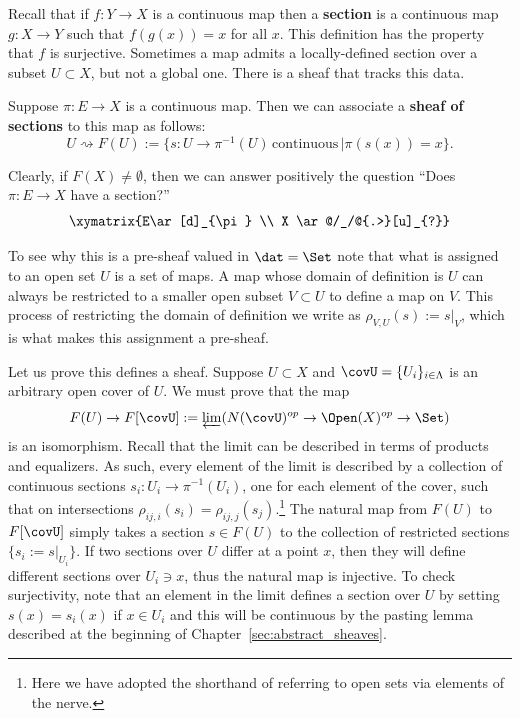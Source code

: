 Recall that if $f:Y\to X$ is a continuous map then a \textbf{section} is a continuous map $g:X\to Y$ such that $f(g(x))=x$ for all $x$. This definition has the property that $f$ is surjective. Sometimes a map admits a locally-defined section over a subset $U\subset X$, but not a global one. There is a sheaf that tracks this data.

\begin{defn}
	Suppose $\pi:E\to X$ is a continuous map. Then we can associate a \textbf{sheaf of sections} to this map as follows:
	\[
	U\rightsquigarrow F(U):=\{s:U\to \pi^{-1}(U)\,\mathrm{continuous}\, | \pi(s(x))=x \}.
	\]
\end{defn}

Clearly, if $F(X)\neq \emptyset$, then we can answer positively the question ``Does $\pi:E\to X$ have a section?''
\[
\xymatrix{E\ar[d]_{\pi} \\ X \ar@/_/@{.>}[u]_{?}}
\]

To see why this is a pre-sheaf valued in $\dat=\Set$ note that what is assigned to an open set $U$ is a set of maps. A map whose domain of definition is $U$ can always be restricted to a smaller open subset $V\subset U$ to define a map on $V$. This process of restricting the domain of definition we write as $\rho_{V,U}(s):=s|_V$, which is what makes this assignment a pre-sheaf. 

Let us prove this defines a sheaf. Suppose $U\subset X$ and $\covU=\{U_i\}_{i\in\Lambda}$ is an arbitrary open cover of $U$. We must prove that the map
\[
F(U)\to F[\covU]:=\varprojlim(N(\covU)^{op}\to\Open(X)^{op}\to \Set)
\]
is an isomorphism.
Recall that the limit can be described in terms of products and equalizers. As such, every element of the limit is described by a collection of continuous sections $s_i:U_i\to \pi^{-1}(U_i)$, one for each element of the cover, such that on intersections $\rho_{ij,i}(s_i)=\rho_{ij,j}(s_j)$.\footnote{Here we have adopted the shorthand of referring to open sets via elements of the nerve.} The natural map from $F(U)$ to $F[\covU]$ simply takes a section $s\in F(U)$ to the collection of restricted sections $\{s_i:=s|_{U_i}\}$. If two sections over $U$ differ at a point $x$, then they will define different sections over $U_i\ni x$, thus the natural map is injective. To check surjectivity, note that an element in the limit defines a section over $U$ by setting $s(x)=s_i(x)$ if $x\in U_i$ and this will be continuous by the pasting lemma described at the beginning of Chapter~\ref{sec:abstract_sheaves}.

